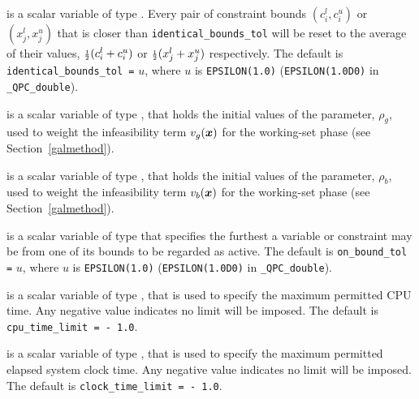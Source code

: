 \documentclass{galahad}
\newcommand{\packagename}{QPC}
\newcommand{\fullpackagename}{\libraryname\_\packagename}
\begin{document}
\begin{description}
is a scalar variable of type \realdp.
Every pair of constraint bounds 
$(c_{i}^{l}, c_{i}^{u})$ or $(x_{j}^{l}, x_{j}^{u})$
that is closer than {\tt identical\_bounds\_tol} 
will be reset to the average of their values,
${\scriptstyle \frac{1}{2}} (c_{i}^{l} + c_{i}^{u})$ or ${\scriptstyle \frac{1}{2}} (x_{j}^{l} + x_{j}^{u})$
respectively.
The default is {\tt identical\_bounds\_tol =} $u$,
where $u$ is {\tt EPSILON(1.0)} ({\tt EPSILON(1.0D0)} in 
{\tt \fullpackagename\_double}).

 is a scalar variable of type \realdp, that holds 
the initial values of the parameter, $\rho_g$, 
used to weight the infeasibility term $v_g({\bm{x}})$
for the working-set phase (see Section~\ref{galmethod}).

 is a scalar variable of type \realdp, that holds 
the initial values of the parameter, $\rho_b$, 
used to weight the infeasibility term $v_b({\bm{x}})$
for the working-set phase (see Section~\ref{galmethod}).

is a scalar variable of type \realdp
that specifies the furthest a variable or constraint
may be from one of its bounds to be regarded as active.
The default is {\tt on\_bound\_tol =} $u$,
where $u$ is {\tt EPSILON(1.0)} ({\tt EPSILON(1.0D0)} in 
{\tt \fullpackagename\_double}).



 is a scalar variable of type \realdp, 
that is used to specify the maximum permitted CPU time. Any negative
value indicates no limit will be imposed. The default is 
{\tt cpu\_time\_limit = - 1.0}.

 is a scalar variable of type \realdp, 
that is used to specify the maximum permitted elapsed system clock time. 
Any negative value indicates no limit will be imposed. The default is 
{\tt clock\_time\_limit = - 1.0}.


\end{description}
\end{document}
